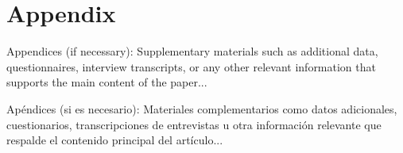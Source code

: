 \appendix 
\section{Appendix} %

Appendices (if necessary): Supplementary materials such as additional data, questionnaires, interview transcripts, or any other relevant information that supports the main content of the paper...

Apéndices (si es necesario): Materiales complementarios como datos adicionales, cuestionarios, transcripciones de entrevistas u otra información relevante que respalde el contenido principal del artículo...